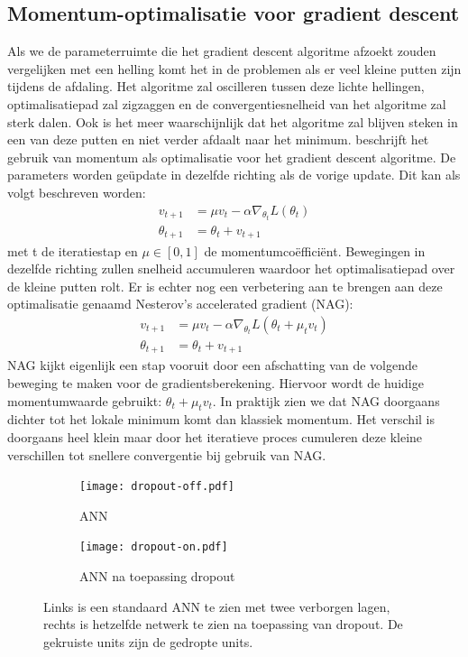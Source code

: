 \subsection{Momentum-optimalisatie voor gradient descent}
Als we de parameterruimte die het gradient descent algoritme afzoekt zouden vergelijken met een helling komt het in de problemen als er veel kleine putten zijn tijdens de afdaling. Het algoritme zal oscilleren tussen deze lichte hellingen, optimalisatiepad zal zigzaggen en de convergentiesnelheid van het algoritme zal sterk dalen. Ook is het meer waarschijnlijk dat het algoritme zal blijven steken in een van deze putten en niet verder afdaalt naar het minimum.
\npar \cite{botev_nesterovs_2016} beschrijft het gebruik van momentum als optimalisatie voor het gradient descent algoritme. De parameters worden ge\"update in dezelfde richting als de vorige update. Dit kan als volgt beschreven worden:
\begin{equation}
\begin{aligned}
v_{t+1} &= \mu v_{t} - \alpha\nabla_{\theta_t} L(\theta_{t})\\
\theta_{t+1} &= \theta_t + v_{t+1}
\end{aligned}
\end{equation}
met t de iteratiestap en $\mu \in[0,1]$ de momentumco\"effici\"ent. Bewegingen in dezelfde richting zullen snelheid accumuleren waardoor het optimalisatiepad over de kleine putten rolt. Er is echter nog een verbetering aan te brengen aan deze optimalisatie genaamd Nesterov's accelerated gradient (NAG):
\begin{equation}
\begin{aligned}
v_{t+1} &= \mu v_t - \alpha\nabla_{\theta_t} L(\theta_{t}+\mu_tv_t)\\
\theta_{t+1} &= \theta_t + v_{t+1}
\end{aligned}
\end{equation}
\npar NAG kijkt eigenlijk een stap vooruit door een afschatting van de volgende beweging te maken voor de gradientsberekening. Hiervoor wordt de huidige momentumwaarde gebruikt: $\theta_{t}+\mu_tv_t$.  In praktijk zien we dat NAG doorgaans dichter tot het lokale minimum komt dan klassiek momentum. Het verschil is doorgaans heel klein maar door het iteratieve proces cumuleren deze kleine verschillen  tot snellere convergentie bij gebruik van NAG.
\begin{figure}[ht!]
	\centering
	\begin{subfigure}{.5\textwidth}
		\centering
		\texttt{[image: dropout-off.pdf]}
		\caption{ANN}
		\label{fig:neuron}
	\end{subfigure}%
	\begin{subfigure}{.5\textwidth}
		\centering
		\texttt{[image: dropout-on.pdf]}
		\caption{ANN na toepassing dropout}
		\label{fig:ANN}
	\end{subfigure}
	\caption{Links is een standaard ANN te zien met twee verborgen lagen, rechts is hetzelfde netwerk te zien na toepassing van dropout. De gekruiste units zijn de gedropte units.}
	\label{fig:test}
\end{figure}
